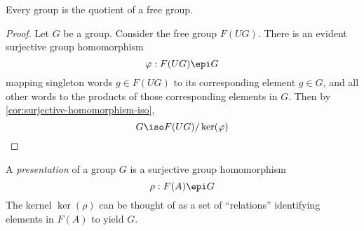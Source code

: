 \documentclass{amsart}
\begin{document}
\begin{thm}
  Every group is the quotient of a free group.
\end{thm}
\begin{proof}
  Let $G$ be a group.
  Consider the free group $F(UG)$.
  There is an evident surjective group homomorphism
  \[
    \varphi : F(UG) \epi G
  \]
  mapping singleton words $g \in F(UG)$ to its corresponding element $g \in G$, and all other words to the products of those corresponding elements in $G$.
  Then by \cref{cor:surjective-homomorphism-iso},
  \[
    G \iso F(UG)/\ker(\varphi)
  \]
\end{proof}

\begin{defn}
  A \emph{presentation} of a group $G$ is a surjective group homomorphism
  \[
    \rho : F(A) \epi G
  \]
  The kernel $\ker(\rho)$ can be thought of as a set of ``relations'' identifying elements in $F(A)$ to yield $G$.
\end{defn}
\end{document}
